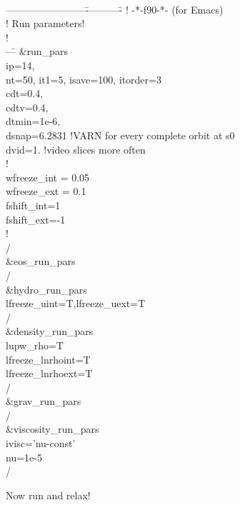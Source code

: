 \documentclass[a4paper,10pt]{article}
\newcommand{\pderiv}[2]{\frac{\partial #1}{\partial #2}}
\renewcommand{\v}[1]{{\boldsymbol #1}} %
\newcommand{\del}{\v{\nabla}}
\newcommand{\grad}{\del}
\begin{document}
{\tt 
\begin{tabbing}
------------------------\=-----------\=\kill
! \>                          -*-f90-*-\>     (for Emacs)\\
!  Run parameters!\\
!\\
---\=\kill 
\&run\_pars\\
  \>ip=14,\\
  \>nt=50, it1=5, isave=100, itorder=3\\
  \>cdt=0.4,\\ 
  \>cdtv=0.4, \\
  \>dtmin=1e-6,\\
  \>dsnap=6.2831   !VARN for every complete orbit at s0\\
  \>dvid=1.        !video slices more often\\
!\\
  \>wfreeze\_int = 0.05\\
  \>wfreeze\_ext = 0.1\\
  \>fshift\_int=1\\
  \>fshift\_ext=-1\\
!\\
/\\
\&eos\_run\_pars\\
/\\
\&hydro\_run\_pars\\
  \>lfreeze\_uint=T,lfreeze\_uext=T\\
/\\
\&density\_run\_pars\\
  \>lupw\_rho=T\\
  \>lfreeze\_lnrhoint=T\\
  \>lfreeze\_lnrhoext=T\\
/\\
\&grav\_run\_pars\\
/\\
\&viscosity\_run\_pars\\
  \>ivisc='nu-const'\\
  \>nu=1e-5\\
/
\end{tabbing}
}

Now run and relax!


%
%
%
\end{document}
